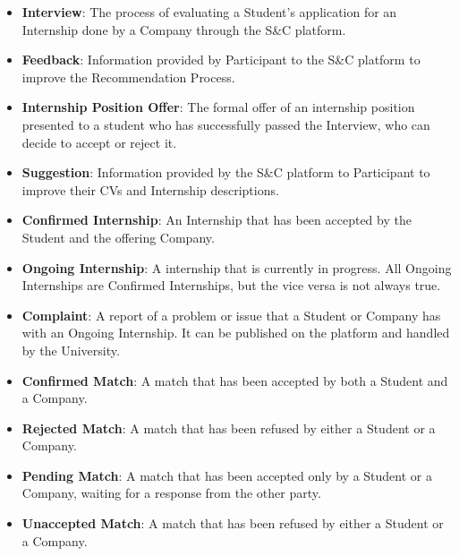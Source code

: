 \begin{itemize}
    \item \textcolor{titleColor}{\textbf{Interview}\label{def:Interview}}: The process of evaluating a Student's application for an Internship done by a Company through the S\&C platform. 
    \item \textcolor{titleColor}{\textbf{Feedback}\label{def:Feedback}}: Information provided by Participant to the S\&C platform to improve the Recommendation Process.
    \item \textcolor{titleColor}{\textbf{Internship Position Offer}\label{def:internshipPositionOffer}}: The formal offer of an internship position presented to a student who has successfully passed the Interview, who can decide to accept or reject it.
    \item \textcolor{titleColor}{\textbf{Suggestion}\label{def:suggestion}}: Information provided by the S\&C platform to Participant to improve their CVs and Internship descriptions.
    \item \textcolor{titleColor}{\textbf{Confirmed Internship}\label{def:confirmdInternship}}: An Internship that has been accepted by the Student and the offering Company.
    \item \textcolor{titleColor}{\textbf{Ongoing Internship}\label{def:ongoing}}: A internship that is currently in progress. All Ongoing Internships are Confirmed Internships, but the vice versa is not always true.
    \item \textcolor{titleColor}{\textbf{Complaint}\label{def:complaint}}: A report of a problem or issue that a Student or Company has with an Ongoing Internship. It can be published on the platform and handled by the University.
    \item \textcolor{titleColor}{\textbf{Confirmed Match}\label{def:confirmedMatch}}: A match that has been accepted by both a Student and a Company.
    \item \textcolor{titleColor}{\textbf{Rejected Match}\label{def:rejectedMatch}}: A match that has been refused by either a Student or a Company.
    \item \textcolor{titleColor}{\textbf{Pending Match}\label{def:pendingMatch}}: A match that has been accepted only by a Student or a Company, waiting for a response from the other party.
    \item \textcolor{titleColor}{\textbf{Unaccepted Match}\label{def:unacceptedMatch}}: A match that has been refused by either a Student or a Company.

    
    
\end{itemize}

